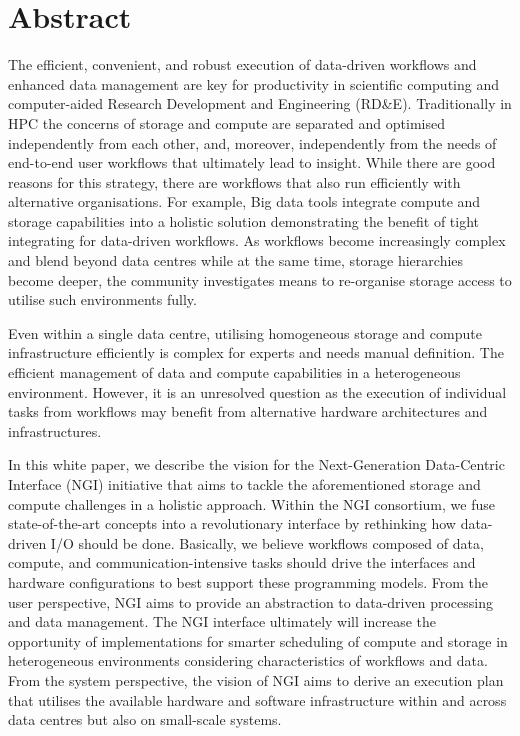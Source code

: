 \documentclass[a4paper, twocolumn]{article}
\title{\papertitle}
\author{Julian M. Kunkel
  \textit{University of Reading}
    \and
  Chris Hoffman
  \textit{National Center for Atmospheric Research}
  \and
  Andy Poling
  \textit{Kove}
  \and
  Jay Lofstead \textit{Sandia National Laboratories}
}
\date{\today}
\begin{document}
\maketitle
\thispagestyle{fancy}

\section*{Abstract}
The efficient, convenient, and robust execution of data-driven workflows and enhanced data management are key for productivity in scientific computing and computer-aided Research Development and Engineering (RD\&E).
Traditionally in HPC the concerns of storage and compute are separated and optimised independently from each other, and, moreover, independently from the needs of end-to-end user workflows that ultimately lead to insight.
While there are good reasons for this strategy, there are workflows that also run efficiently with alternative organisations.
For example, Big data tools integrate compute and storage capabilities into a holistic solution demonstrating the benefit of tight integrating for data-driven workflows.
As workflows become increasingly complex and blend beyond data centres while at the same time, storage hierarchies become deeper, the community investigates means to re-organise storage access to utilise such environments fully.


Even within a single data centre, utilising homogeneous storage and compute infrastructure efficiently is complex for experts and needs manual definition.
The efficient management of data and compute capabilities in a heterogeneous environment. However, it is an unresolved question as the execution of individual tasks from workflows may benefit from alternative hardware architectures and infrastructures.

In this white paper, we describe the vision for the Next-Generation Data-Centric Interface (NGI) initiative that aims to tackle the aforementioned storage and compute challenges in a holistic approach.
Within the NGI consortium, we fuse state-of-the-art concepts into a revolutionary interface by rethinking how data-driven I/O should be done.
Basically, we believe workflows composed of data, compute, and communication-intensive tasks should drive the interfaces and hardware configurations to best support these programming models.
From the user perspective, NGI aims to provide an abstraction to data-driven processing and data management.
The NGI interface ultimately will increase the opportunity of implementations for smarter scheduling of compute and storage in heterogeneous environments considering characteristics of workflows and data.
From the system perspective, the vision of NGI aims to derive an execution plan that utilises the available hardware and software infrastructure within and across data centres but also on small-scale systems.
\end{document}
